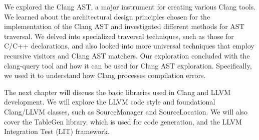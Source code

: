 We explored the Clang AST, a major instrument for creating various Clang tools. We learned about the architectural design principles chosen for the implementation of the Clang AST and investigated different methods for AST traversal. We delved into specialized traversal techniques, such as those for C/C++ declarations, and also looked into more universal techniques that employ recursive visitors and Clang AST matchers. Our exploration concluded with the clang-query tool and how it can be used for Clang AST exploration. Specifically, we used it to understand how Clang processes compilation errors.

The next chapter will discuss the basic libraries used in Clang and LLVM development. We will explore the LLVM code style and foundational Clang/LLVM classes, such as SourceManager and SourceLocation. We will also cover the TableGen library, which is used for code generation, and the LLVM Integration Test (LIT) framework.